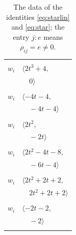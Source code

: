 \documentclass[11pt]{article}
\begin{document}
\begingroup\scriptsize
\setlength{\LTcapwidth}{\textwidth}
\begin{longtable}{@{}ll@{}}
\caption{The data of the identities \eqref{eq:starlin} and \eqref{eq:star}; the entry $j{:}e$ means $\rho_{ij}=e\neq0$.}\label{tab:star}\\
\hline\endfirsthead\hline\endhead\hline\endfoot
\multicolumn{2}{@{}p{0.97\textwidth}@{}}{$i=0$, $D_i=1$, $\rho_{ij}$: $8{:}1, \allowbreak 13{:}1, \allowbreak 16{:}1, \allowbreak 17{:}2$}\\
$w_i$ & $\langle 2t^{3}+4,$\\
 & $\quad 0\rangle$\\
\addlinespace[2pt]
\multicolumn{2}{@{}p{0.97\textwidth}@{}}{$i=1$, $D_i=1$, $\rho_{ij}$: $2{:}2, \allowbreak 4{:}1, \allowbreak 5{:}2, \allowbreak 6{:}1, \allowbreak 10{:}2, \allowbreak 12{:}1, \allowbreak 13{:}2, \allowbreak 15{:}2, \allowbreak 17{:}2$}\\
$w_i$ & $\langle -4t-4,$\\
 & $\quad -4t-4\rangle$\\
\addlinespace[2pt]
\multicolumn{2}{@{}p{0.97\textwidth}@{}}{$i=2$, $D_i=1$, $\rho_{ij}$: $1{:}1, \allowbreak 9{:}2, \allowbreak 14{:}2, \allowbreak 18{:}2, \allowbreak 19{:}2$}\\
$w_i$ & $\langle 2t^{2},$\\
 & $\quad -2t\rangle$\\
\addlinespace[2pt]
\multicolumn{2}{@{}p{0.97\textwidth}@{}}{$i=3$, $D_i=1$, $\rho_{ij}$: $9{:}2, \allowbreak 10{:}2, \allowbreak 11{:}1, \allowbreak 12{:}1, \allowbreak 16{:}1, \allowbreak 18{:}1$}\\
$w_i$ & $\langle 2t^{2}-4t-8,$\\
 & $\quad -6t-4\rangle$\\
\addlinespace[2pt]
\multicolumn{2}{@{}p{0.97\textwidth}@{}}{$i=4$, $D_i=1$, $\rho_{ij}$: $1{:}2, \allowbreak 10{:}2, \allowbreak 12{:}1, \allowbreak 14{:}2, \allowbreak 19{:}2$}\\
$w_i$ & $\langle 2t^{2}+2t+2,$\\
 & $\quad 2t^{2}+2t+2\rangle$\\
\addlinespace[2pt]
\multicolumn{2}{@{}p{0.97\textwidth}@{}}{$i=5$, $D_i=1$, $\rho_{ij}$: $1{:}1, \allowbreak 8{:}2, \allowbreak 11{:}2, \allowbreak 12{:}2, \allowbreak 18{:}2, \allowbreak 19{:}2$}\\
$w_i$ & $\langle -2t-2,$\\
 & $\quad -2\rangle$\\
\addlinespace[2pt]
\multicolumn{2}{@{}p{0.97\textwidth}@{}}{$i=6$, $D_i=1$, $\rho_{ij}$: $1{:}2, \allowbreak 8{:}2, \allowbreak 9{:}2, \allowbreak 10{:}1, \allowbreak 18{:}2, \allowbreak 19{:}2$}\\

\end{longtable}
\end{document}
